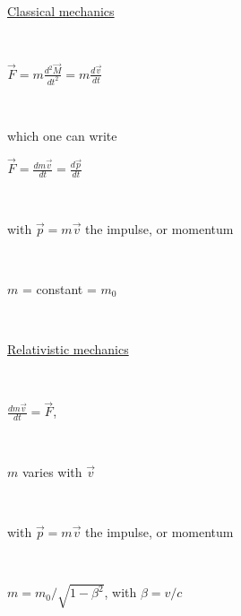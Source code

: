 \documentclass[12pt]{paper}
\newcommand{\F}{\ensuremath{\vec F}}
\newcommand{\vv}{\ensuremath{\vec v}}
\newcommand{\blue}{\color{blue}}
\begin{document}
~

\begin{minipage}[b]{.49\linewidth}
\centering
\Large

\blue 

\underline{Classical mechanics }

~

$\F = m \frac{ \textstyle{d^2 \vec M}}{\textstyle{dt^2}} = m \frac{ \textstyle{d\vv}}{\textstyle{dt}} $ 

~

which one can  write

$\F =   \frac{ \textstyle{d m \vv}}{\textstyle{dt}} =  \frac{ \textstyle{d\vec p}}{\textstyle{dt}}  $ 

~

with $\vec p = m \vv$ the impulse, or momentum

~

 $m$  = constant = $m_0$

~
\end{minipage}
\begin{minipage}[b]{.49\linewidth}
\centering
\Large

\blue 

\underline{Relativistic mechanics}


~

$\frac{ \textstyle{dm\vv}}{\textstyle{dt}} = \F $, 

~

 $m$ varies with $\vv$

~

with $\vec p = m \vv$ the impulse, or momentum

~

 $m = m_0 / \sqrt{1- \beta^2}$, with $\beta = v/c$

~

~

\end{minipage}



\clearpage

\end{document}
